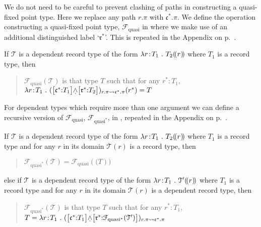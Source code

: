 \begin{shaded}
We do not need to be careful to prevent clashing of paths in
constructing a quasi-fixed point type.  Here we replace any path
$r.\pi$ with $\mathfrak{c}^*.\pi$.  We define the operation
constructing a quasi-fixed point type, $\mathcal{F}_{\text{quasi}}$ in
\nexteg{}  where we make use of an additional distinguished label
`$\mathfrak{r}^*$'.  This is repeated in the
Appendix on p.~\pageref{pg:fixedpointtype}.
\begin{ex} 
If $\mathcal{T}$ is a dependent record type of the form $\lambda
r\!:\!T_1\ .\ T_2(\!(r)\!)$ where $T_1$ is a record type,
then
\begin{quote}
  $\mathcal{F}_{\text{quasi}}(\mathcal{T})$ is that type $T$ such that for any
  $r^*:T_1$, $\lambda r\!:\!T_1\ .\
  (\text{\smallrecord{\smalltfield{$\mathfrak{c}^*$}{$T_1$}}\d{$\wedge$}\smallrecord{
      \smalltfield{$\mathfrak{r}^*$}{$T_2$}}})_{r.\pi\leadsto\mathfrak{c}^*.\pi}(r^*)=T$
\end{quote}
\label{ex:quasifixedpointtype}
\end{ex}
For dependent types which require more than one argument we can define
a recursive version of $\mathcal{F}_{\text{quasi}}$,
$\mathcal{F}_{\text{quasi}^*}$, in \nexteg{}, repeated in the
Appendix on p.~\pageref{pg:fixedpointtype}.
\begin{ex} 
If $\mathcal{T}$ is a dependent record type of the form $\lambda
r\!:\!T_1\ .\ T_2(\!(r)\!)$ where $T_1$ is a record type and for any $r$
in its domain $\mathcal{T}(r)$ is a record type, then
\begin{quote}
  $\mathcal{F}_{\text{quasi}^*}(\mathcal{T}) =
  \mathcal{F}_{\text{quasi}}(\mathcal(T))$
\end{quote}
else if $\mathcal{T}$ is a dependent record type of the form $\lambda
r\!:\!T_1\ .\ \mathcal{T}'(\!(r)\!)$  where  $T_1$ is a record type and
for any $r$ in its domain $\mathcal{T}(r)$ is a dependent record type,
then
\begin{quote}
  $\mathcal{F}_{\text{quasi}^*}(\mathcal{T})$ is that type $T$ such
  that for any $r^*:T_1$, $T = \lambda r\!:\!T_1\ .\
  (\text{\smallrecord{
      \smalltfield{$\mathfrak{c}^*$}{$T_1$}}\d{$\wedge$}\smallrecord{
      \smalltfield{$\mathfrak{r}^*$}{$\mathcal{F}_{\text{quasi}^*}(\mathcal{T}')$}}})_{r.\pi\leadsto\mathfrak{c}^*.\pi}$
\end{quote}

\end{ex} 
  

\end{shaded}


